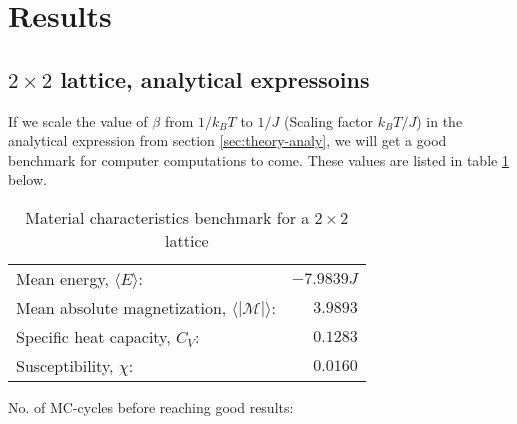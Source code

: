 \documentclass[../main.tex]{subfiles}
\begin{document}
\section{Results}
\subsection{$2 \times 2$ lattice, analytical expressoins}
If we scale the value of $\beta$ from $1/k_BT$ to $1/J$ (Scaling factor $k_B T/J$) in the analytical expression from section \ref{sec:theory-analy}, we will get a good benchmark for computer computations to come. These values are listed in table \ref{tab:2x2spinsEnergiesMags} below.
\begin{table}[!h]
\begin{center}
  \begin{tabular}{l r}
    Mean energy, $\langle E \rangle$: & $-7.9839J$  \\
    Mean absolute magnetization, $\langle |\mathcal{M}| \rangle$: & $3.9893$ \\
    Specific heat capacity, $C_V$: & $0.1283$\\
    Susceptibility, $\chi$: & $0.0160$
  \end{tabular}
  \caption{Material characteristics benchmark for a $2 \times 2$ lattice}
  \label{tab:2x2spinsEnergiesMags}
  No. of MC-cycles before reaching good results: 
\end{center}
\end{table}
\FloatBarrier
\end{document}
